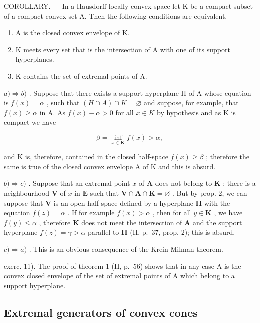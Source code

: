 COROLLARY. --- In a Hausdorff locally convex space let K be a compact subset of a compact convex set A. Then the following conditions are equivalent.

\begin{enumerate}
\def\labelenumi{\alph{enumi})}
\item
  A is the closed convex envelope of K.
\item
  K meets every set that is the intersection of A with one of its support hyperplanes.
\item
  K contains the set of extremal points of A.
\end{enumerate}

\(a) \Rightarrow b)\) . Suppose that there exists a support hyperplane H of A whose equation is \(f(x) = \alpha\) , such that \((H \cap A) \cap K = \varnothing\) and suppose, for example, that \(f(x) \geqslant \alpha\) in A. As \(f(x) - \alpha > 0\) for all \(x \in K\) by hypothesis and as K is compact we have

\[
\beta = \inf _ {x \in \mathbf {K}} f (x) > \alpha ,
\]

and K is, therefore, contained in the closed half-space \(f(x) \geqslant \beta\) ; therefore the same is true of the closed convex envelope A of K and this is absurd.

\(b) \Rightarrow c)\) . Suppose that an extremal point \(x\) of \(\mathbf{A}\) does not belong to \(\mathbf{K}\) ; there is a neighbourhood \(\mathbf{V}\) of \(x\) in \(\mathbf{E}\) such that \(\mathbf{V} \cap \mathbf{A} \cap \mathbf{K} = \varnothing\) . But by prop. 2, we can suppose that \(\mathbf{V}\) is an open half-space defined by a hyperplane \(\mathbf{H}\) with the equation \(f(z) = \alpha\) . If for example \(f(x) > \alpha\) , then for all \(y \in \mathbf{K}\) , we have \(f(y) \leqslant \alpha\) , therefore \(\mathbf{K}\) does not meet the intersection of \(\mathbf{A}\) and the support hyperplane \(f(z) = \gamma > \alpha\) parallel to \(\mathbf{H}\) (II, p.~37, prop. 2); this is absurd.

\(c) \Rightarrow a)\) . This is an obvious consequence of the Krein-Milman theorem.

exerc. 11). The proof of theorem 1 (II, p.~56) shows that in any case A is the convex closed envelope of the set of extremal points of A which belong to a support hyperplane.

\subsection{Extremal generators of convex cones}

